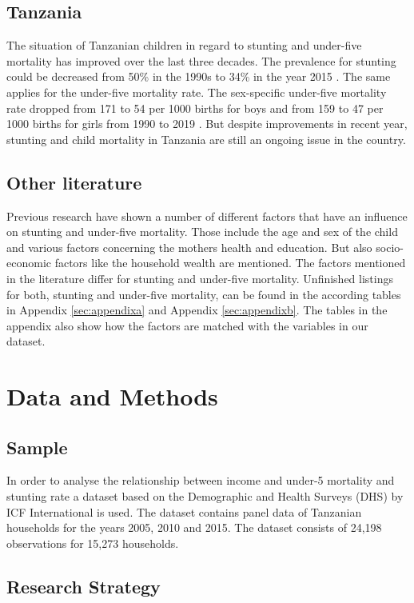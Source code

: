 \documentclass[a4paper, 11pt]{article} %
\begin{document}
\subsection*{Tanzania}
The situation of Tanzanian children in regard to stunting and under-five mortality has improved over the last three decades. The prevalence for stunting could be decreased from 50\% in the 1990s to 34\% in the year 2015 \cite{UNI18}. The same applies for the under-five mortality rate. The sex-specific under-five mortality rate dropped from 171 to 54 per 1000 births for boys and from 159 to 47 per 1000 births for girls from 1990 to 2019 \cite{UN20}. But despite improvements in recent year, stunting and child mortality in Tanzania are still an ongoing issue in the country. 


\subsection*{Other literature}
Previous research have shown a number of different factors that have an influence on stunting and under-five mortality. Those include the age and sex of the child and various factors concerning the mothers health and education. But also socio-economic factors like the household wealth are mentioned. The factors mentioned in the literature differ for stunting and under-five mortality. Unfinished listings for both, stunting and under-five mortality, can be found in the according tables in Appendix \ref{sec:appendixa} and Appendix \ref{sec:appendixb}.  The tables in the appendix also show how the factors are matched with the variables in our dataset.


\section{Data and Methods}
\subsection*{Sample}

In order to analyse the relationship between income and under-5 mortality and stunting rate a dataset based on the Demographic and Health Surveys (DHS) \cite{DHS20} by ICF International is used. The dataset contains panel data of Tanzanian households for the years 2005, 2010 and 2015. The dataset consists of 24,198 observations for 15,273 households.

\subsection*{Research Strategy}
\end{document}
